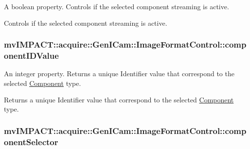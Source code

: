A boolean property. Controls if the selected component streaming is active. 

Controls if the selected component streaming is active. \hypertarget{classmv_i_m_p_a_c_t_1_1acquire_1_1_gen_i_cam_1_1_image_format_control_a99685f27c0089fe69239c14a503342c1}{
\subsubsection[{component\+I\+D\+Value}]{ mv\+I\+M\+P\+A\+C\+T\+::acquire\+::\+Gen\+I\+Cam\+::\+Image\+Format\+Control\+::component\+I\+D\+Value}}\label{classmv_i_m_p_a_c_t_1_1acquire_1_1_gen_i_cam_1_1_image_format_control_a99685f27c0089fe69239c14a503342c1}


An integer property. Returns a unique Identifier value that correspond to the selected \hyperlink{classmv_i_m_p_a_c_t_1_1acquire_1_1_component}{Component} type. 

Returns a unique Identifier value that correspond to the selected \hyperlink{classmv_i_m_p_a_c_t_1_1acquire_1_1_component}{Component} type. \hypertarget{classmv_i_m_p_a_c_t_1_1acquire_1_1_gen_i_cam_1_1_image_format_control_a1096fd210e8ed296fc47a416688b8678}{
\subsubsection[{component\+Selector}]{ mv\+I\+M\+P\+A\+C\+T\+::acquire\+::\+Gen\+I\+Cam\+::\+Image\+Format\+Control\+::component\+Selector}}\label{classmv_i_m_p_a_c_t_1_1acquire_1_1_gen_i_cam_1_1_image_format_control_a1096fd210e8ed296fc47a416688b8678}


